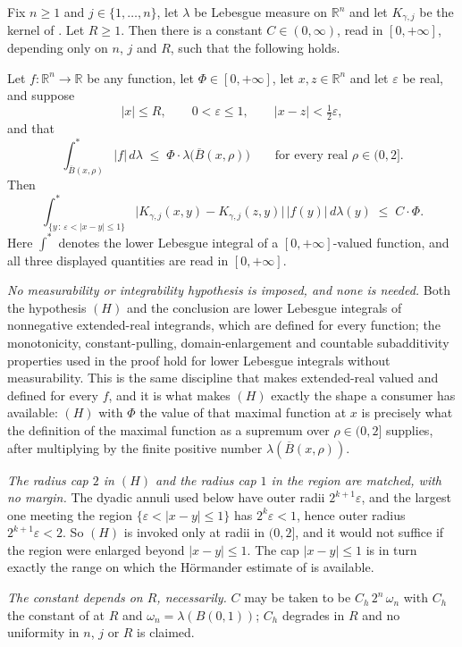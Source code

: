 \begin{lemma}
Fix $n \geq 1$ and $j \in \{1,\ldots,n\}$, let $\lambda$ be Lebesgue measure on
$\mathbb{R}^n$ and let $K_{\gamma,j}$ be the kernel of
.  Let $R \geq 1$.  Then there is a constant
$C \in (0,\infty)$, read in $[0,+\infty]$, depending only on $n$, $j$ and $R$,
such that the following holds.

Let $f : \mathbb{R}^n \to \mathbb{R}$ be any function, let
$\Phi \in [0,+\infty]$, let $x,z \in \mathbb{R}^n$ and let $\varepsilon$ be
real, and suppose
\[
  |x| \leq R, \qquad 0 < \varepsilon \leq 1, \qquad |x-z| < \tfrac12\varepsilon ,
\]
and that
\begin{equation*}
  \int_{\overline B(x,\rho)}^{*}|f|\,d\lambda
    \;\leq\; \Phi\cdot\lambda\bigl(\overline B(x,\rho)\bigr)
  \qquad\text{for every real } \rho \in (0,2] . \tag{H}
\end{equation*}
Then
\[
  \int_{\{y\,:\,\varepsilon < |x-y| \leq 1\}}^{*}
      \bigl|K_{\gamma,j}(x,y)-K_{\gamma,j}(z,y)\bigr|\,|f(y)|\,d\lambda(y)
    \;\leq\; C\cdot\Phi .
\]
Here $\int^{*}$ denotes the lower Lebesgue integral of a $[0,+\infty]$-valued
function, and all three displayed quantities are read in $[0,+\infty]$.

\emph{No measurability or integrability hypothesis is imposed, and none is
needed.}  Both the hypothesis $(H)$ and the conclusion are lower Lebesgue
integrals of nonnegative extended-real integrands, which are defined for every
function; the monotonicity, constant-pulling, domain-enlargement and countable
subadditivity properties used in the proof hold for lower Lebesgue integrals
without measurability. This is the same discipline that makes
 extended-real valued and defined for every $f$,
and it is what makes $(H)$ exactly the shape a consumer has available: $(H)$ with
$\Phi$ the value of that maximal function at $x$ is precisely what the
definition of the maximal function as a supremum over $\rho \in (0,2]$ supplies,
after multiplying by the finite positive number
$\lambda(\overline B(x,\rho))$.

\emph{The radius cap $2$ in $(H)$ and the radius cap $1$ in the region are
matched, with no margin.}  The dyadic annuli used below have outer radii
$2^{k+1}\varepsilon$, and the largest one meeting the region
$\{\varepsilon < |x-y| \leq 1\}$ has $2^k\varepsilon < 1$, hence outer radius
$2^{k+1}\varepsilon < 2$.  So $(H)$ is invoked only at radii in $(0,2]$, and it
would not suffice if the region were enlarged beyond $|x-y| \leq 1$.  The cap
$|x-y| \leq 1$ is in turn exactly the range on which the H\"ormander estimate of
 is available.

\emph{The constant depends on $R$, necessarily.}  $C$ may be taken to be
$C_h\,2^n\,\omega_n$ with $C_h$ the constant of
 at $R$ and
$\omega_n = \lambda(B(0,1))$; $C_h$ degrades in $R$ and no uniformity in $n$,
$j$ or $R$ is claimed.
\end{lemma}
